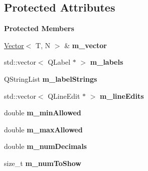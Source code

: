 \subsection*{Protected Attributes}
\begin{Indent}\textbf{ Protected Members}\par
\begin{DoxyCompactItemize}
\item 
\mbox{\label{classrev_1_1_view_1_1_vector_widget_af2134a4b121269b38d073f965e8af90e}} 
\mbox{\hyperlink{classrev_1_1_vector}{Vector}}$<$ T, N $>$ \& {\bfseries m\+\_\+vector}
\item 
\mbox{\label{classrev_1_1_view_1_1_vector_widget_aa91a37addd0ab61d81ecbc5e73c16793}} 
std\+::vector$<$ Q\+Label $\ast$ $>$ {\bfseries m\+\_\+labels}
\item 
\mbox{\label{classrev_1_1_view_1_1_vector_widget_a2b3ba93a152e20a0ddae9ef227b7d9c4}} 
Q\+String\+List {\bfseries m\+\_\+label\+Strings}
\item 
\mbox{\label{classrev_1_1_view_1_1_vector_widget_ac7a74efc981d1f9c534c3de109774982}} 
std\+::vector$<$ Q\+Line\+Edit $\ast$ $>$ {\bfseries m\+\_\+line\+Edits}
\item 
\mbox{\label{classrev_1_1_view_1_1_vector_widget_abd0a3e51aa78f66b477b2af54e27f842}} 
double {\bfseries m\+\_\+min\+Allowed}
\item 
\mbox{\label{classrev_1_1_view_1_1_vector_widget_a5330dd82fcbcb656984dafdfe3f97765}} 
double {\bfseries m\+\_\+max\+Allowed}
\item 
\mbox{\label{classrev_1_1_view_1_1_vector_widget_a73e89bf36c355e91d23141b163cd4f28}} 
double {\bfseries m\+\_\+num\+Decimals}
\item 
\mbox{\label{classrev_1_1_view_1_1_vector_widget_a706cfa0531b681eba90dd912b9436541}} 
size\+\_\+t {\bfseries m\+\_\+num\+To\+Show}
\end{DoxyCompactItemize}
\end{Indent}
